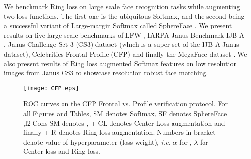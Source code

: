 \documentclass[10pt,twocolumn,letterpaper]{article}
\begin{document}
We benchmark Ring loss on large scale face recognition tasks while augmenting two loss functions. The first one is the ubiquitous Softmax, and the second being a successful variant of Large-margin Softmax \cite{liu2016large} called SphereFace \cite{liu2017sphereface}.  We present results on five large-scale benchmarks of LFW \cite{LFWTech}, IARPA Janus Benchmark IJB-A   \cite{klare2015pushing}, Janus Challenge Set 3 (CS3) dataset (which is a super set of the IJB-A Janus dataset), Celebrities Frontal-Profile (CFP) \cite{sengupta2016frontal} and finally the MegaFace dataset \cite{kemelmacher2016megaface}. We also present results of Ring loss augmented Softmax features on low resolution images from Janus CS3 to showcase resolution robust face matching.

\begin{figure}%
        \centering
            \texttt{[image: CFP.eps]}
        
    \vspace{-0.2cm}
\caption{ ROC curves on the CFP Frontal vs. Profile verification protocol. For all Figures and Tables, SM denotes Softmax, SF denotes SphereFace \cite{liu2017sphereface},l2-Cons SM denotes \cite{ranjan2017l2}, + CL denotes Center Loss augmentation \cite{wen2016discriminative} and finally + R denotes Ring loss augmentation. Numbers in bracket denote value of hyperparameter (loss weight), \emph{i.e.} $\alpha$ for \cite{ranjan2017l2}, $\lambda$ for Center loss and Ring loss.}
\label{fig_cfp}
\vspace{-0.5cm}
\end{figure}


\end{document}
